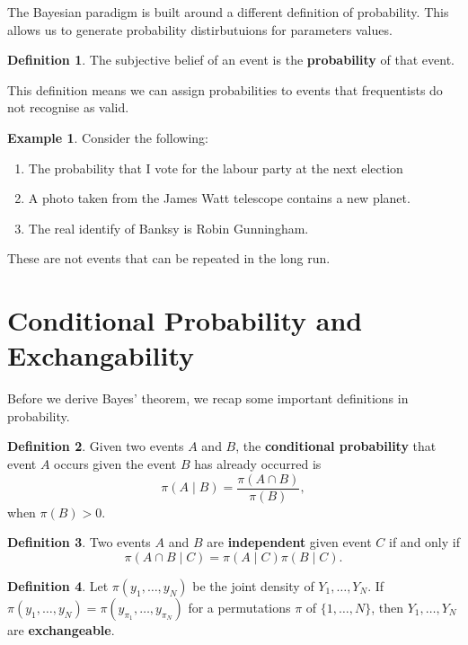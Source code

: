 \documentclass[
]{book}
\theoremstyle{definition}
\newtheorem{definition}{Definition}[chapter]
\theoremstyle{definition}
\newtheorem{example}{Example}[chapter]
\theoremstyle{definition}
\theoremstyle{definition}
\theoremstyle{remark}
\begin{document}
The Bayesian paradigm is built around a different definition of probability. This allows us to generate probability distirbutuions for parameters values.

\begin{definition}
The subjective belief of an event is the \textbf{probability} of that event.
\end{definition}

This definition means we can assign probabilities to events that frequentists do not recognise as valid.

\begin{example}
Consider the following:

\begin{enumerate}
\def\labelenumi{\arabic{enumi}.}
\item
  The probability that I vote for the labour party at the next election
\item
  A photo taken from the James Watt telescope contains a new planet.
\item
  The real identify of Banksy is Robin Gunningham.
\end{enumerate}

These are not events that can be repeated in the long run.
\end{example}

\hypertarget{conditional-probability-and-exchangability}{%
\section{Conditional Probability and Exchangability}\label{conditional-probability-and-exchangability}}

Before we derive Bayes' theorem, we recap some important definitions in probability.

\begin{definition}
Given two events \(A\) and \(B\), the \textbf{conditional probability} that event \(A\) occurs given the event \(B\) has already occurred is
\[
\pi(A \mid B) = \frac{\pi(A \cap B)}{\pi(B)}, 
\]
when \(\pi(B) > 0\).
\end{definition}

\begin{definition}
Two events \(A\) and \(B\) are \textbf{independent} given event \(C\) if and only if
\[ \pi(A \cap B \mid C) = \pi(A \mid C)\pi(B \mid C).\]
\end{definition}

\begin{definition}
Let \(\pi(y_1, \ldots, y_N)\) be the joint density of \(Y_1, \ldots, Y_N\). If \(\pi(y_1, \ldots, y_N) = \pi(y_{\pi_1}, \ldots, y_{\pi_N})\) for a permutations \(\pi\) of \(\{1, \ldots, N\}\), then \(Y_1, \ldots, Y_N\) are \textbf{exchangeable}.
\end{definition}
\end{document}
